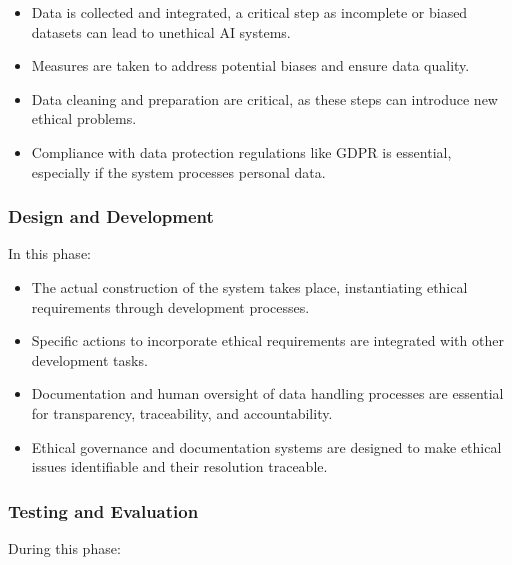 \documentclass{article}
\begin{document}
\begin{itemize}

    \item Data is collected and integrated, a critical step as incomplete or biased datasets can lead to unethical AI systems.

    \item Measures are taken to address potential biases and ensure data quality.

    \item Data cleaning and preparation are critical, as these steps can introduce new ethical problems.

    \item Compliance with data protection regulations like GDPR is essential, especially if the system processes personal data.

\end{itemize}

\subsubsection{Design and Development}

In this phase:

\begin{itemize}

    \item The actual construction of the system takes place, instantiating ethical requirements through development processes.

    \item Specific actions to incorporate ethical requirements are integrated with other development tasks.

    \item Documentation and human oversight of data handling processes are essential for transparency, traceability, and accountability.

    \item Ethical governance and documentation systems are designed to make ethical issues identifiable and their resolution traceable.

\end{itemize}

\subsubsection{Testing and Evaluation}

During this phase:
\end{document}
